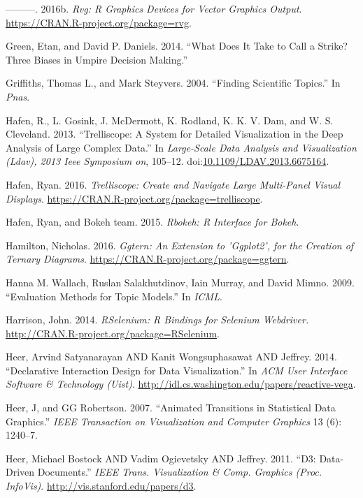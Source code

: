 \documentclass[12pt,]{isuthesis}
\begin{document}
\hypertarget{ref-rvg}{}
---------. 2016b. \emph{Rvg: R Graphics Devices for Vector Graphics
Output}. \url{https://CRAN.R-project.org/package=rvg}.

\hypertarget{ref-bias}{}
Green, Etan, and David P. Daniels. 2014. ``What Does It Take to Call a
Strike? Three Biases in Umpire Decision Making.''

\hypertarget{ref-Griffiths}{}
Griffiths, Thomas L., and Mark Steyvers. 2004. ``Finding Scientific
Topics.'' In \emph{Pnas}.

\hypertarget{ref-trelliscope}{}
Hafen, R., L. Gosink, J. McDermott, K. Rodland, K. K. V. Dam, and W. S.
Cleveland. 2013. ``Trelliscope: A System for Detailed Visualization in
the Deep Analysis of Large Complex Data.'' In \emph{Large-Scale Data
Analysis and Visualization (Ldav), 2013 Ieee Symposium on}, 105--12.
doi:\href{https://doi.org/10.1109/LDAV.2013.6675164}{10.1109/LDAV.2013.6675164}.

\hypertarget{ref-trelliscope-pkg}{}
Hafen, Ryan. 2016. \emph{Trelliscope: Create and Navigate Large
Multi-Panel Visual Displays}.
\url{https://CRAN.R-project.org/package=trelliscope}.

\hypertarget{ref-rbokeh}{}
Hafen, Ryan, and Bokeh team. 2015. \emph{Rbokeh: R Interface for Bokeh}.

\hypertarget{ref-ggtern}{}
Hamilton, Nicholas. 2016. \emph{Ggtern: An Extension to 'Ggplot2', for
the Creation of Ternary Diagrams}.
\url{https://CRAN.R-project.org/package=ggtern}.

\hypertarget{ref-Wallach}{}
Hanna M. Wallach, Ruslan Salakhutdinov, Iain Murray, and David Mimno.
2009. ``Evaluation Methods for Topic Models.'' In \emph{ICML}.

\hypertarget{ref-RSelenium}{}
Harrison, John. 2014. \emph{RSelenium: R Bindings for Selenium
Webdriver.} \url{http://CRAN.R-project.org/package=RSelenium}.

\hypertarget{ref-vega}{}
Heer, Arvind Satyanarayan AND Kanit Wongsuphasawat AND Jeffrey. 2014.
``Declarative Interaction Design for Data Visualization.'' In \emph{ACM
User Interface Software \& Technology (Uist)}.
\url{http://idl.cs.washington.edu/papers/reactive-vega}.

\hypertarget{ref-animated-transitions}{}
Heer, J, and GG Robertson. 2007. ``Animated Transitions in Statistical
Data Graphics.'' \emph{IEEE Transaction on Visualization and Computer
Graphics} 13 (6): 1240--7.

\hypertarget{ref-Bostock:2011}{}
Heer, Michael Bostock AND Vadim Ogievetsky AND Jeffrey. 2011. ``D3:
Data-Driven Documents.'' \emph{IEEE Trans. Visualization \& Comp.
Graphics (Proc. InfoVis)}. \url{http://vis.stanford.edu/papers/d3}.
\end{document}
